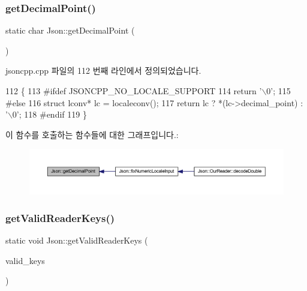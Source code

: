 \subsubsection{\texorpdfstring{get\+Decimal\+Point()}{getDecimalPoint()}}
{\footnotesize\ttfamily static char Json\+::get\+Decimal\+Point (\begin{DoxyParamCaption}{ }\end{DoxyParamCaption})\hspace{0.3cm}{\ttfamily [static]}}



jsoncpp.\+cpp 파일의 112 번째 라인에서 정의되었습니다.


\begin{DoxyCode}
112                               \{
113 \textcolor{preprocessor}{#ifdef JSONCPP\_NO\_LOCALE\_SUPPORT}
114   \textcolor{keywordflow}{return} \textcolor{charliteral}{'\(\backslash\)0'};
115 \textcolor{preprocessor}{#else}
116   \textcolor{keyword}{struct }lconv* lc = localeconv();
117   \textcolor{keywordflow}{return} lc ? *(lc->decimal\_point) : \textcolor{charliteral}{'\(\backslash\)0'};
118 \textcolor{preprocessor}{#endif}
119 \}
\end{DoxyCode}
이 함수를 호출하는 함수들에 대한 그래프입니다.\+:\nopagebreak
\begin{figure}[H]
\begin{center}
\leavevmode
\includegraphics[width=350pt]{namespace_json_ac99d7a5551039dfa712dd1d143c25a16_icgraph}
\end{center}
\end{figure}
\mbox{\label{namespace_json_a8c38450840f3d88e9b981ae132f7ad0a}} 
\subsubsection{\texorpdfstring{get\+Valid\+Reader\+Keys()}{getValidReaderKeys()}}
{\footnotesize\ttfamily static void Json\+::get\+Valid\+Reader\+Keys (\begin{DoxyParamCaption}\item[{std\+::set$<$ \hyperlink{json_8h_a1e723f95759de062585bc4a8fd3fa4be}{J\+S\+O\+N\+C\+P\+P\+\_\+\+S\+T\+R\+I\+NG} $>$ $\ast$}]{valid\+\_\+keys }\end{DoxyParamCaption})\hspace{0.3cm}{\ttfamily [static]}}



